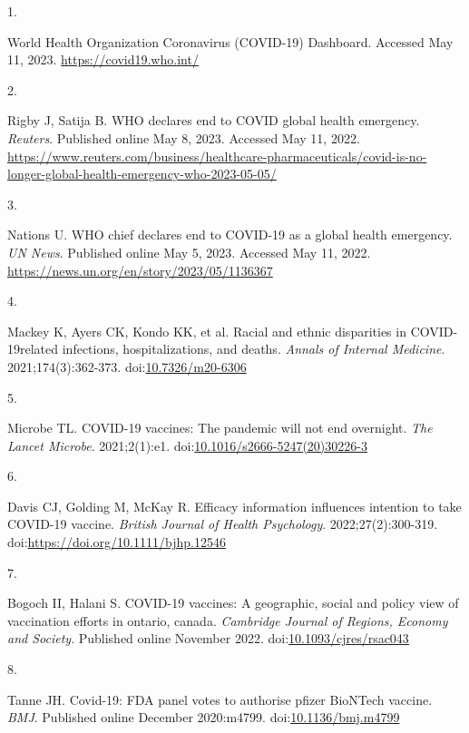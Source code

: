 \documentclass[
  letterpaper,
  DIV=11,
  numbers=noendperiod]{scrartcl}
\newlength{\cslhangindent}
\newlength{\csllabelwidth}
\newlength{\cslentryspacingunit} %
\newenvironment{CSLReferences}[2] %
 {%
  \setlength{\parindent}{0pt}
  \ifodd #1
  \let\oldpar\par
  \def\par{\hangindent=\cslhangindent\oldpar}
  \fi
  \setlength{\parskip}{#2\cslentryspacingunit}
 }%
 {}
\newcommand{\CSLLeftMargin}[1]{\parbox[t]{\csllabelwidth}{#1}}
\newcommand{\CSLRightInline}[1]{\parbox[t]{\linewidth - \csllabelwidth}{#1}\break}
\begin{document}
\hypertarget{refs}{}
\begin{CSLReferences}{0}{0}
\leavevmode{}%
\CSLLeftMargin{1. }%
\CSLRightInline{{World Health Organization Coronavirus (COVID-19)
Dashboard}. Accessed May 11, 2023. \url{https://covid19.who.int/}}

\leavevmode{}%
\CSLLeftMargin{2. }%
\CSLRightInline{Rigby J, Satija B. {WHO} declares end to COVID global
health emergency. \emph{Reuters}. Published online May 8, 2023. Accessed
May 11, 2022.
\url{https://www.reuters.com/business/healthcare-pharmaceuticals/covid-is-no-longer-global-health-emergency-who-2023-05-05/}}

\leavevmode{}%
\CSLLeftMargin{3. }%
\CSLRightInline{Nations U. {WHO} chief declares end to COVID-19 as a
global health emergency. \emph{UN News}. Published online May 5, 2023.
Accessed May 11, 2022.
\url{https://news.un.org/en/story/2023/05/1136367}}

\leavevmode{}%
\CSLLeftMargin{4. }%
\CSLRightInline{Mackey K, Ayers CK, Kondo KK, et al. Racial and ethnic
disparities in {COVID}-19{\textendash}related infections,
hospitalizations, and deaths. \emph{Annals of Internal Medicine}.
2021;174(3):362-373.
doi:\href{https://doi.org/10.7326/m20-6306}{10.7326/m20-6306}}

\leavevmode{}%
\CSLLeftMargin{5. }%
\CSLRightInline{Microbe TL. {COVID}-19 vaccines: The pandemic will not
end overnight. \emph{The Lancet Microbe}. 2021;2(1):e1.
doi:\href{https://doi.org/10.1016/s2666-5247(20)30226-3}{10.1016/s2666-5247(20)30226-3}}

\leavevmode{}%
\CSLLeftMargin{6. }%
\CSLRightInline{Davis CJ, Golding M, McKay R. Efficacy information
influences intention to take COVID-19 vaccine. \emph{British Journal of
Health Psychology}. 2022;27(2):300-319.
doi:\url{https://doi.org/10.1111/bjhp.12546}}

\leavevmode{}%
\CSLLeftMargin{7. }%
\CSLRightInline{Bogoch II, Halani S. {COVID}-19 vaccines: A geographic,
social and policy view of vaccination efforts in ontario, canada.
\emph{Cambridge Journal of Regions, Economy and Society}. Published
online November 2022.
doi:\href{https://doi.org/10.1093/cjres/rsac043}{10.1093/cjres/rsac043}}

\leavevmode{}%
\CSLLeftMargin{8. }%
\CSLRightInline{Tanne JH. Covid-19: {FDA} panel votes to authorise
pfizer {BioNTech} vaccine. \emph{{BMJ}}. Published online December
2020:m4799.
doi:\href{https://doi.org/10.1136/bmj.m4799}{10.1136/bmj.m4799}}


\end{CSLReferences}
\end{document}
